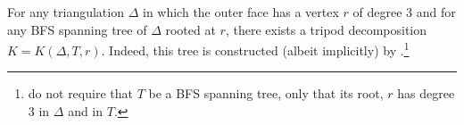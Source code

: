 \documentclass{patmorin}
\renewcommand{\proplabel}[1]{\label{prop:#1}}
\renewcommand{\propref}[1]{(PR\ref{prop:#1})}
\begin{document}
For any triangulation $\Delta$ in which the outer face has a vertex $r$ of degree 3 and for any BFS spanning tree of $\Delta$ rooted at $r$, there exists a tripod decomposition $K=K(\Delta,T,r)$.  Indeed, this tree is constructed (albeit implicitly) by \citet[Proof of Lemma~14]{dujmovic.joret.ea:planar}.\footnote{\citet{dujmovic.joret.ea:planar} do not require that $T$ be a BFS spanning tree, only that its root, $r$ has degree 3 in $\Delta$ and in $T$.}


% 
% 
% 
% 
% 
% 
\end{document}
